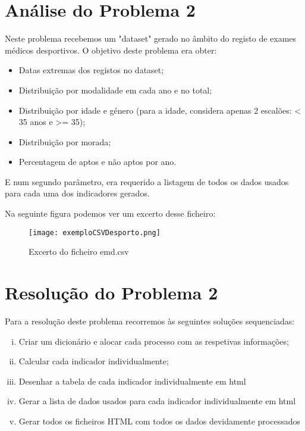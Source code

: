\documentclass[11pt,a4paper]{report}%
\begin{document}
\section{Análise do Problema 2} \label{sec:analiseProb2}
Neste problema recebemos um "dataset" gerado no âmbito do registo de exames médicos desportivos.
O objetivo deste problema era obter:

\begin{itemize}
  \item Datas extremas dos registos no dataset;
  \item Distribuição por modalidade em cada ano e no total;
  \item Distribuição por idade e género (para a idade, considera apenas 2 escalões: < 35 anos e >= 35);
  \item Distribuição por morada;
  \item Percentagem de aptos e não aptos por ano.
\end{itemize}

E num segundo parâmetro, era requerido a listagem de todos os dados usados para cada uma dos indicadores gerados.

Na seguinte figura podemos ver um excerto desse ficheiro:\\
\begin{figure}[htbp]
\centerline{\texttt{[image: exemploCSVDesporto.png]}}
\caption{Excerto do ficheiro emd.csv}
\label{fig}
\end{figure}

\newpage
\section{Resolução do Problema 2} \label{sec:resProb2}

Para a resolução deste problema recorremos às seguintes soluções sequenciadas:

\begin{enumerate}[i)]
     \item Criar um dicionário e alocar cada processo com as respetivas informações;
     \item Calcular cada indicador individualmente; 
     \item Desenhar a tabela de cada indicador individualmente em html
     \item Gerar a lista de dados usados para cada indicador individualmente em html
	 \item Gerar todos os ficheiros HTML com todos os dados devidamente processados
  \end{enumerate}
  
\end{document}
